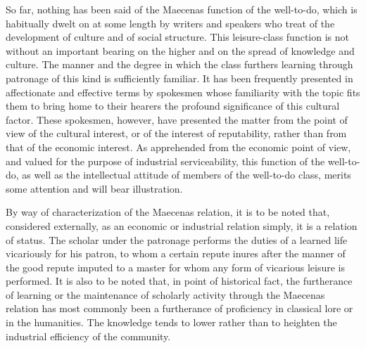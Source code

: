 \documentclass[12pt]{report}
\begin{document}
So far, nothing has been said of the Maecenas function of the
well-to-do, which is habitually dwelt on at some length by writers
and speakers who treat of the development of culture and of social
structure. This leisure-class function is not without an important
bearing on the higher and on the spread of knowledge and culture. The
manner and the degree in which the class furthers learning through
patronage of this kind is sufficiently familiar. It has been frequently
presented in affectionate and effective terms by spokesmen whose
familiarity with the topic fits them to bring home to their hearers the
profound significance of this cultural factor. These spokesmen, however,
have presented the matter from the point of view of the cultural
interest, or of the interest of reputability, rather than from that of
the economic interest. As apprehended from the economic point of view,
and valued for the purpose of industrial serviceability, this function
of the well-to-do, as well as the intellectual attitude of members of
the well-to-do class, merits some attention and will bear illustration.

By way of characterization of the Maecenas relation, it is to be noted
that, considered externally, as an economic or industrial relation
simply, it is a relation of status. The scholar under the patronage
performs the duties of a learned life vicariously for his patron, to
whom a certain repute inures after the manner of the good repute imputed
to a master for whom any form of vicarious leisure is performed. It is
also to be noted that, in point of historical fact, the furtherance of
learning or the maintenance of scholarly activity through the Maecenas
relation has most commonly been a furtherance of proficiency in
classical lore or in the humanities. The knowledge tends to lower rather
than to heighten the industrial efficiency of the community.
\end{document}
